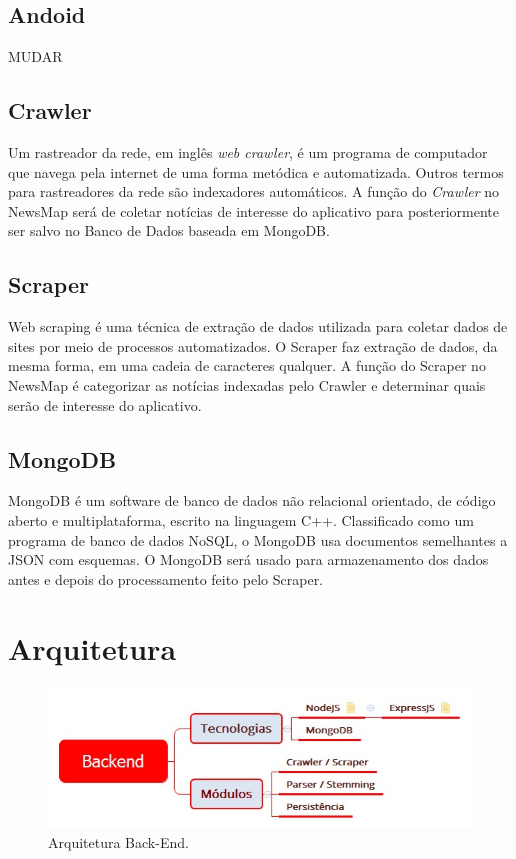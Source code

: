 \documentclass[
	12pt,				%
	openright,			%
	twoside,			%
	a4paper,			%
	english,			%
	french,				%
	spanish,			%
	brazil,				%
	]{abntex2}
\begin{document}
\section*{Andoid }

MUDAR

\section*{Crawler}

Um rastreador da rede, em inglês \textit{web crawler}, é um programa de computador que navega pela internet de uma forma metódica e automatizada. Outros termos para rastreadores da rede são indexadores automáticos. A função do \textit{Crawler} no NewsMap será de coletar notícias de interesse do aplicativo para posteriormente ser salvo no Banco de Dados baseada em MongoDB.

\section*{Scraper}

Web scraping é uma técnica de extração de dados utilizada para coletar dados de sites por meio de processos automatizados. O Scraper faz extração de dados, da mesma forma, em uma cadeia de caracteres qualquer. A função do Scraper no NewsMap é categorizar as notícias indexadas pelo Crawler e determinar quais serão de interesse do aplicativo.

\section*{MongoDB}

MongoDB é um software de banco de dados não relacional orientado, de código aberto e multiplataforma, escrito na linguagem C++. Classificado como um programa de banco de dados NoSQL, o MongoDB usa documentos semelhantes a JSON com esquemas. O MongoDB será usado para armazenamento dos dados antes e depois do processamento feito pelo Scraper.


\chapter{Arquitetura}

\begin{figure}[h]
	\caption{\label{backend_figura}Arquitetura Back-End.}
	\begin{center}
		\includegraphics[scale=0.6]{figuras/arquitetura-backend.jpeg}
	\end{center}
\end{figure}
\end{document}
